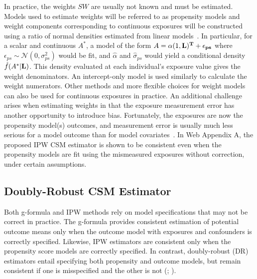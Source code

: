 \documentclass[useAMS,usenatbib,referee]{biom}
\begin{document}
In practice, the weights $SW$ are usually not known and must be estimated. Models used to estimate weights will be referred to as propensity models and weight components corresponding to continuous exposures will be constructed using a ratio of normal densities estimated from linear models~\citep{hirano2004}. In particular, for a scalar and continuous $A^{*}$, a model of the form $A = \alpha (1, \bf{L})^{T} + \epsilon_{ps}$ where $\epsilon_{ps} \sim \mathcal{N}(0, \sigma^{2}_{ps})$ would be fit, and $\hat{\alpha}$ and $\hat{\sigma}_{ps}$ would yield a conditional density $\hat{f}(A^{*}|\bf{L})$. This density evaluated at each individual's exposure value gives the weight denominators. An intercept-only model is used similarly to calculate the weight numerators. Other methods and more flexible choices for weight models~\citep{naimi2014} can also be used for continuous exposures in practice. An additional challenge arises when estimating weights in that the exposure measurement error has another opportunity to introduce bias. Fortunately, the exposures are now the propensity model(s) outcomes, and measurement error is usually much less serious for a model outcome than for model covariates~\citep{carroll2006}. In Web Appendix A, the proposed IPW CSM estimator is shown to be consistent even when the propensity models are fit using the mismeasured exposures without correction, under certain assumptions.

\subsection{Doubly-Robust CSM Estimator}

Both g-formula and IPW methods rely on model specifications that may not be correct in practice. The g-formula provides consistent estimation of potential outcome means only when the outcome model with exposures and confounders is correctly specified. Likewise, IPW estimators are consistent only when the propensity score models are correctly specified. In contrast, doubly-robust (DR) estimators entail specifying both propensity and outcome models, but remain consistent if one is misspecified and the other is not (\citealp*{robins1994}; \citealp{lunceford2004,bang2005}).
\end{document}
